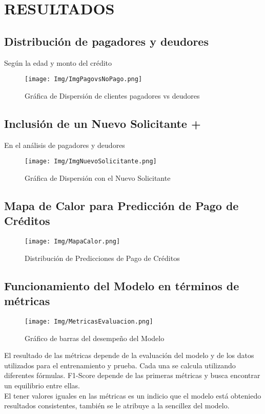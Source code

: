 \documentclass{article}
\begin{document}
\begin{sloppypar}
\section{RESULTADOS}
\vspace{0.5cm}
\subsection{Distribución de pagadores y deudores} Según la edad y monto del crédito
    \begin{figure}[H]
    \centering
    \texttt{[image: Img/ImgPagovsNoPago.png]}    \caption{\label{fig:PagadoresDeudores}Gráfica de Dispersión de clientes pagadores vs deudores}
    \end{figure}
\vspace{0.5cm}
\subsection{Inclusión de un Nuevo Solicitante \textbf{+}} En el análisis de pagadores y deudores
    \begin{figure}[H]
    \centering
    \texttt{[image: Img/ImgNuevoSolicitante.png]}    \caption{\label{fig:nuevoSolicitante}Gráfica de Dispersión con el Nuevo Solicitante}
    \end{figure}
\vspace{0.5cm}
\subsection{Mapa de Calor para Predicción de Pago de Créditos}
    \begin{figure}[H]
    \centering
    \texttt{[image: Img/MapaCalor.png]}    \caption{\label{fig:MapaCalorPC}Distribución de Predicciones de Pago de Créditos}
    \end{figure}
\vspace{0.5cm}
\subsection{Funcionamiento del Modelo en términos de métricas}
    \begin{figure}[H]
    \centering
    \texttt{[image: Img/MetricasEvaluacion.png]}    \caption{\label{fig:MapaCalor} Gráfico de barras del desempeño del Modelo}
    \end{figure}
El resultado de las métricas depende de la evaluación del modelo y de los datos utilizados para el entrenamiento y prueba. Cada una se calcula utilizando diferentes fórmulas.  F1-Score depende de las primeras métricas y busca encontrar un equilibrio entre ellas. \\
El tener valores iguales en las métricas es un indicio que el modelo está obteniedo resultados consistentes, también se le atribuye a la sencillez del modelo.
\clearpage


\end{sloppypar}
\end{document}
